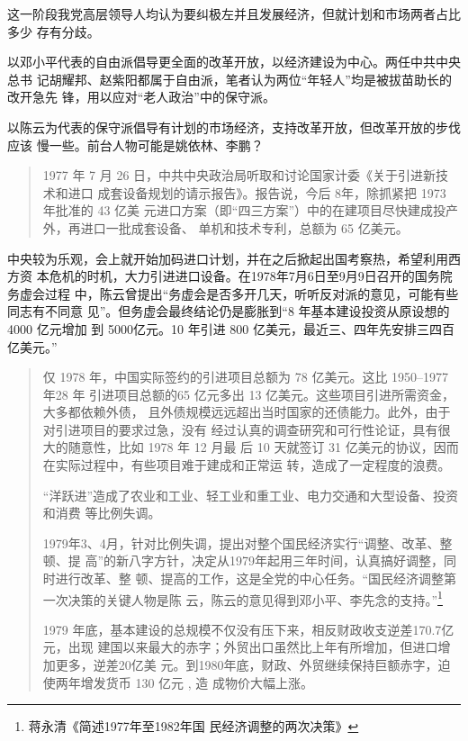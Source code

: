 

这一阶段我党高层领导人均认为要纠极左并且发展经济，但就计划和市场两者占比多少
存有分歧。

以邓小平代表的自由派倡导更全面的改革开放，以经济建设为中心。两任中共中央总书
记胡耀邦、赵紫阳都属于自由派，笔者认为两位“年轻人”均是被拔苗助长的改开急先
锋，用以应对“老人政治”中的保守派。

以陈云为代表的保守派倡导有计划的市场经济，支持改革开放，但改革开放的步伐应该
慢一些。前台人物可能是姚依林、李鹏？

\begin{quotation}
  1977 年 7 月 26 日，中共中央政治局听取和讨论国家计委《关于引进新技术和进口
  成套设备规划的请示报告》。报告说，今后 8年，除抓紧把 1973 年批准的 43 亿美
  元进口方案（即“四三方案”）中的在建项目尽快建成投产外，再进口一批成套设备、
  单机和技术专利，总额为 65 亿美元。\cite{yangyuejin}
\end{quotation}
中央较为乐观，会上就开始加码进口计划，并在之后掀起出国考察热，希望利用西方资
本危机的时机，大力引进进口设备。在1978年7月6日至9月9日召开的国务院务虚会过程
中，陈云曾提出“务虚会是否多开几天，听听反对派的意见，可能有些同志有不同意
见”。但务虚会最终结论仍是膨胀到“8 年基本建设投资从原设想的 4000 亿元增加
到 5000亿元。10 年引进 800 亿美元，最近三、四年先安排三四百亿美元。”
\begin{quotation}
  仅 1978 年，中国实际签约的引进项目总额为 78 亿美元。这比 1950--1977年28 年
  引进项目总额的65 亿元多出 13 亿美元。这些项目引进所需资金，大多都依赖外债，
  且外债规模远远超出当时国家的还债能力。此外，由于对引进项目的要求过急，没有
  经过认真的调查研究和可行性论证，具有很大的随意性，比如 1978 年 12 月最
  后 10 天就签订 31 亿美元的协议，因而在实际过程中，有些项目难于建成和正常运
  转，造成了一定程度的浪费。\cite{yangyuejin}

  “洋跃进”造成了农业和工业、轻工业和重工业、电力交通和大型设备、投资和消费
  等比例失调。

  1979年3、4月，针对比例失调，提出对整个国民经济实行“调整、改革、整顿、提
  高”的新八字方针，决定从1979年起用三年时间，认真搞好调整，同时进行改革、整
  顿、提高的工作，这是全党的中心任务。“国民经济调整第一次决策的关键人物是陈
  云，陈云的意见得到邓小平、李先念的支持。”\footnote{蒋永清\quad 《简述1977年至1982年国
    民经济调整的两次决策》}

  1979 年底，基本建设的总规模不仅没有压下来，相反财政收支逆差170.7亿元，出现
  建国以来最大的赤字；外贸出口虽然比上年有所增加，但进口增加更多，逆差20亿美
  元。到1980年底，财政、外贸继续保持巨额赤字，迫使两年增发货币 130 亿元 , 造
  成物价大幅上涨。\cite{chenyunjihua}
\end{quotation}

